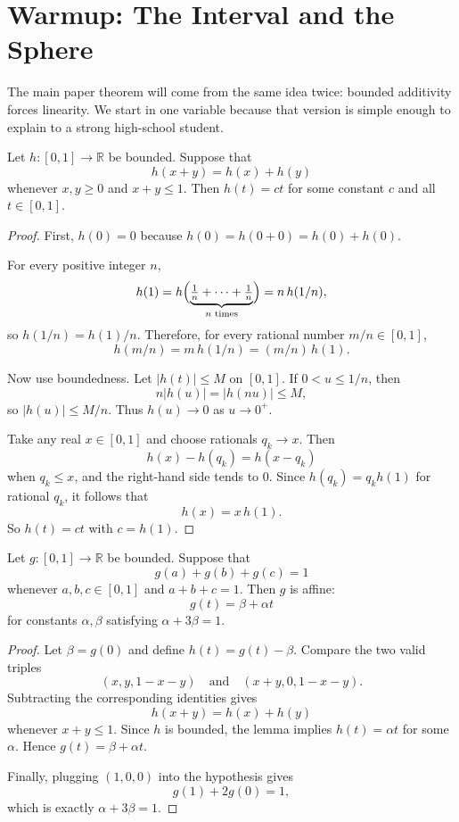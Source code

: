 \section{Warmup: The Interval and the Sphere}




The main paper theorem will come from the same idea twice: bounded additivity forces linearity. We start in one variable because that version is simple enough to explain to a strong high-school student.

\begin{lemma}
Let $h:[0,1]\to\mathbb{R}$ be bounded. Suppose that
\[
h(x+y)=h(x)+h(y)
\]
whenever $x,y \ge 0$ and $x+y \le 1$. Then $h(t)=ct$ for some constant $c$ and all $t\in[0,1]$.
\end{lemma}

\begin{proof}
First, $h(0)=0$ because $h(0)=h(0+0)=h(0)+h(0)$.

For every positive integer $n$,
\[
h(1)=h\Bigl(\underbrace{\tfrac1n+\cdots+\tfrac1n}_{n \text{ times}}\Bigr)=n\,h(1/n),
\]
so $h(1/n)=h(1)/n$. Therefore, for every rational number $m/n \in [0,1]$,
\[
h(m/n)=m\,h(1/n)=(m/n)\,h(1).
\]

Now use boundedness. Let $|h(t)|\le M$ on $[0,1]$. If $0<u\le 1/n$, then
\[
n|h(u)|=|h(nu)|\le M,
\]
so $|h(u)|\le M/n$. Thus $h(u)\to 0$ as $u\to 0^+$.

Take any real $x\in[0,1]$ and choose rationals $q_k\to x$. Then
\[
h(x)-h(q_k)=h(x-q_k)
\]
when $q_k\le x$, and the right-hand side tends to $0$. Since $h(q_k)=q_k h(1)$ for rational $q_k$, it follows that
\[
h(x)=x\,h(1).
\]
So $h(t)=ct$ with $c=h(1)$.
\end{proof}

\begin{theorem}
Let $g:[0,1]\to\mathbb{R}$ be bounded. Suppose that
\[
g(a)+g(b)+g(c)=1
\]
whenever $a,b,c\in[0,1]$ and $a+b+c=1$. Then $g$ is affine:
\[
g(t)=\beta+\alpha t
\]
for constants $\alpha,\beta$ satisfying $\alpha+3\beta=1$.
\end{theorem}

\begin{proof}
Let $\beta=g(0)$ and define $h(t)=g(t)-\beta$. Compare the two valid triples
\[
(x,y,1-x-y)
\quad\text{and}\quad
(x+y,0,1-x-y).
\]
Subtracting the corresponding identities gives
\[
h(x+y)=h(x)+h(y)
\]
whenever $x+y\le 1$. Since $h$ is bounded, the lemma implies $h(t)=\alpha t$ for some $\alpha$. Hence $g(t)=\beta+\alpha t$.

Finally, plugging $(1,0,0)$ into the hypothesis gives
\[
g(1)+2g(0)=1,
\]
which is exactly $\alpha+3\beta=1$.
\end{proof}

